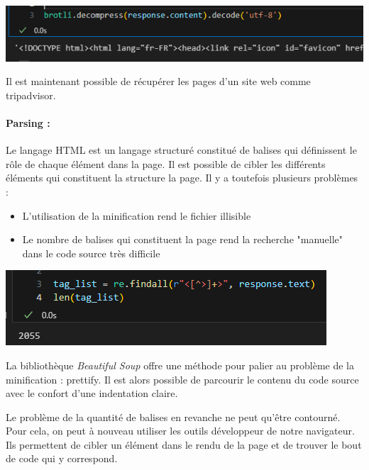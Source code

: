 \begin{center}
\includegraphics[scale=0.8]{Images/brotli.png}
\label{brotly}
\end{center}

Il est maintenant possible de récupérer les pages d'un site web comme tripadvisor.

\paragraph{Parsing :}

Le langage HTML est un langage structuré constitué de balises qui définissent le rôle de chaque élément dans la page. Il est possible de cibler les différents éléments qui constituent la structure la page. Il y a toutefois plusieurs problèmes :
\begin{itemize}
\item L'utilisation de la minification rend le fichier illisible
\item Le nombre de balises qui constituent la page rend la recherche "manuelle" dans le code source très difficile
\end{itemize}

\begin{center}
\includegraphics[scale=0.8]{Images/tag_list.png}
\label{tag_list}
\end{center}

La bibliothèque \textit{Beautiful Soup} offre une méthode pour palier au problème de la minification : prettify. Il est alors possible de parcourir le contenu du code source avec le confort d'une indentation claire.

Le problème de la quantité de balises en revanche ne peut qu'être contourné. Pour cela, on peut à nouveau utiliser les outils développeur de notre navigateur. Ils permettent de cibler un élément dans le rendu de la page et de trouver le bout de code qui y correspond.

